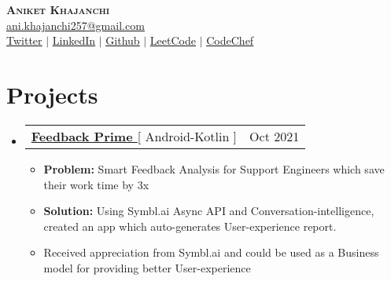 \documentclass[letterpaper,11pt]{article}
\makeatletter
\newcommand{\resumeItem}[1]{
  \item\small{
    {#1 \vspace{-2pt}}
  }
}
\newcommand{\resumeSubheading}[4]{
  \vspace{-2pt}\item
    \begin{tabular*}{0.97\textwidth}[t]{l@{\extracolsep{\fill}}r}
      \textbf{#1} & #2 \\
      \textit{\small#3} & \textit{\small #4} \\
    \end{tabular*}\vspace{-7pt}
}
\newcommand{\resumeSubSubheading}[2]{
    \item
    \begin{tabular*}{0.97\textwidth}{l@{\extracolsep{\fill}}r}
      \textit{\small#1} & \textit{\small #2} \\
    \end{tabular*}\vspace{-7pt}
}
\newcommand{\resumeProjectHeading}[2]{
    \item
    \begin{tabular*}{0.97\textwidth}{l@{\extracolsep{\fill}}r}
      \small#1 & #2 \\
    \end{tabular*}\vspace{-7pt}
}
\newcommand{\resumeSubHeadingListStart}{\begin{itemize}[leftmargin=0.15in, label={}]}
\newcommand{\resumeSubHeadingListEnd}{\end{itemize}}
\newcommand{\resumeItemListStart}{\begin{itemize}}
\newcommand{\resumeItemListEnd}{\end{itemize}\vspace{-5pt}}
\makeatother
\begin{document}

\begin{center}
    \textbf{\Huge \scshape Aniket Khajanchi} \\ \vspace{1pt}
    \href{mailto:ani.khajanchi257@gmail.com}{\underline{ani.khajanchi257@gmail.com}} \\ 
    \href{https://twitter.com/AniketKhajanchi}{\underline{Twitter}} $|$ 
    \href{https://linkedin.com/in/aniketkhajanchi}{\underline{LinkedIn}} $|$
    \href{https://github.com/aniketk13}{\underline{Github}} $|$
    \href{https://leetcode.com/aniketk13}{\underline{LeetCode}} $|$
    \href{https://codechef.com/users/aniketk13}{\underline{CodeChef}}
    
\end{center}


        
    




\section{Projects}
    \resumeSubHeadingListStart
      \resumeProjectHeading
          {\textbf{\href{https://github.com/aniketk13/Feedback-Prime}{Feedback Prime }}{[ Android-Kotlin ]}}{Oct 2021}
          \resumeItemListStart
           \resumeItem{\textbf{Problem:} Smart Feedback Analysis for Support Engineers which save their work time by 3x}
           \resumeItem{\textbf{Solution:} Using Symbl.ai Async API and Conversation-intelligence, created an app which auto-generates User-experience report.}
           \resumeItem{Received appreciation from Symbl.ai and could be used as a Business model for providing better User-experience}
          \resumeItemListEnd
    \resumeSubHeadingListEnd
    
\end{document}
